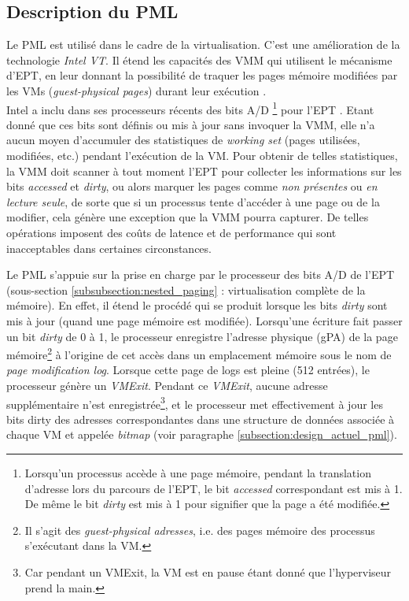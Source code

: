 \subsection{Description du PML}
\label{subsubsection:description_pml}
Le \acs{PML} est utilisé dans le cadre de la virtualisation. C'est une amélioration de la technologie \textit{\ac{Intel VT}}. Il étend les capacités des VMM qui utilisent le mécanisme d'\acs{EPT}, en leur donnant la possibilité de traquer les pages mémoire modifiées par les \acs{VMs} (\textit{guest-physical pages}) durant leur exécution \cite{online5}.\\
Intel a inclu dans ses processeurs récents des bits \ac{A/D} \footnote{Lorsqu'un processus accède à une page mémoire, pendant la translation d'adresse lors du parcours de l'EPT, le bit \textit{accessed} correspondant est mis à 1. De même le bit \textit{dirty} est mis à 1 pour signifier que la page a été modifiée.} pour l'\acs{EPT} \cite{book3}. Etant donné que ces bits sont définis ou mis à jour sans invoquer la VMM, elle n'a aucun moyen d'accumuler des statistiques de \textit{working set} (pages utilisées, modifiées, etc.) pendant l'exécution de la VM. Pour obtenir de telles statistiques, la VMM doit scanner à tout moment l'EPT pour collecter les informations sur les bits \textit{accessed} et \textit{dirty}, ou alors marquer les pages comme \textit{non présentes} ou \emph{en lecture seule}, de sorte que si un processus tente d'accéder à une page ou de la modifier, cela génère une exception que la VMM pourra capturer. De telles opérations imposent des coûts de latence et de performance qui sont inacceptables dans certaines circonstances.\\

\par\noindent Le PML s'appuie sur la prise en charge par le processeur des bits \acs{A/D} de l'\acs{EPT} (sous-section \ref{subsubsection:nested_paging} : virtualisation complète de la mémoire). En effet, il étend le procédé qui se produit lorsque les bits \textit{dirty} sont mis à jour (quand une page mémoire est modifiée). Lorsqu'une écriture fait passer un bit \textit{dirty} de 0 à 1, le processeur enregistre l'adresse physique (\acs{gPA}) de la page mémoire\footnote{Il s'agit des \textit{guest-physical adresses}, i.e. des pages mémoire des processus s'exécutant dans la VM.} à l'origine de cet accès dans un emplacement mémoire sous le nom de \textit{page modification log}. Lorsque cette page de logs est pleine (512 entrées), le processeur génère un \textit{VMExit}. Pendant ce \textit{VMExit}, aucune adresse supplémentaire n'est enregistrée\footnote{Car pendant un VMExit, la VM est en pause étant donné que l'hyperviseur prend la main.}, et le processeur met effectivement à jour les bits dirty des adresses correspondantes dans une structure de données associée à chaque VM et appelée \emph{bitmap} (voir paragraphe \ref{subsection:design_actuel_pml}).\\

